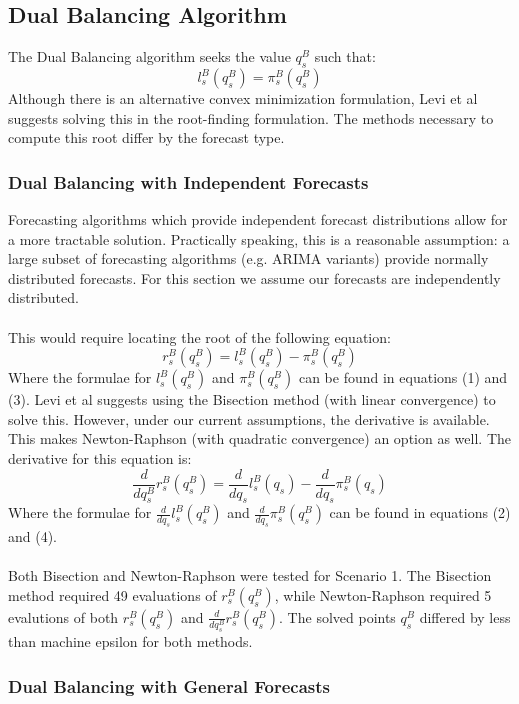 \documentclass[12pt]{report}
\begin{document}
\subsection{Dual Balancing Algorithm}

The Dual Balancing algorithm seeks the value $q_s^B$ such that: 
$$
	l_s^B(q_s^B) = \pi_s^B(q_s^B)
$$
Although there is an alternative convex minimization formulation, Levi et al suggests solving this in the root-finding formulation. The methods necessary to compute this root differ by the forecast type.

\subsubsection{Dual Balancing with Independent Forecasts}

Forecasting algorithms which provide independent forecast distributions allow for a more tractable solution. Practically speaking, this is a reasonable assumption: a large subset of forecasting algorithms (e.g. ARIMA variants) provide normally distributed forecasts. For this section we assume our forecasts are independently distributed. \\
\\
This would require locating the root of the following equation:
$$
	r_s^B(q_s^B) = l_s^B(q_s^B) - \pi_s^B(q_s^B) 
$$
Where the formulae for $l_s^B(q_s^B)$ and $\pi_s^B(q_s^B)$ can be found in equations (1) and (3). Levi et al suggests using the Bisection method (with linear convergence) to solve this. However, under our current assumptions, the derivative is available. This makes Newton-Raphson (with quadratic convergence) an option as well. The derivative for this equation is:
$$
	\frac{d}{dq_s^B} r_s^B(q_s^B) =  \frac{d}{d q_s} l_s^B(q_s) - \frac{d}{d q_s} \pi_s^B(q_s) 
$$
Where the formulae for $ \frac{d}{d q_s} l_s^B(q_s^B)$ and $ \frac{d}{d q_s} \pi_s^B(q_s^B)$ can be found in equations (2) and (4).\\
\\
Both Bisection and Newton-Raphson were tested for Scenario 1. The Bisection method required 49 evaluations of $r_s^B(q_s^B)$, while Newton-Raphson required 5 evalutions of both $r_s^B(q_s^B)$ and $\frac{d}{dq_s^B} r_s^B(q_s^B)$. The solved points $q_s^B$ differed by less than machine epsilon for both methods.

\subsubsection{Dual Balancing with General Forecasts}
\end{document}
